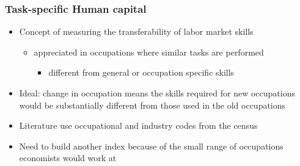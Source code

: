 \documentclass[11pt]{beamer}
\begin{document}
\begin{frame}
	\frametitle{Task-specific Human capital}
	\begin{itemize}
		\item Concept of measuring the transferability of labor market skills
		\begin{itemize}
		\item appreciated in occupations where similar tasks are performed
		\begin{itemize}
			\item different from general or occupation specific skills
		\end{itemize}
		
		\end{itemize}
	\vspace{1.5 mm}
	\item Ideal: change in occupation means the skills required for new occupations would be substantially different from those used in the old occupations
		\vspace{1.5 mm}
	\item Literature use occupational and industry codes from the census
		\vspace{1.5 mm}
	\item Need to build another index because of the small range of occupations economists would work at
	\end{itemize}
\end{frame}
\end{document}
